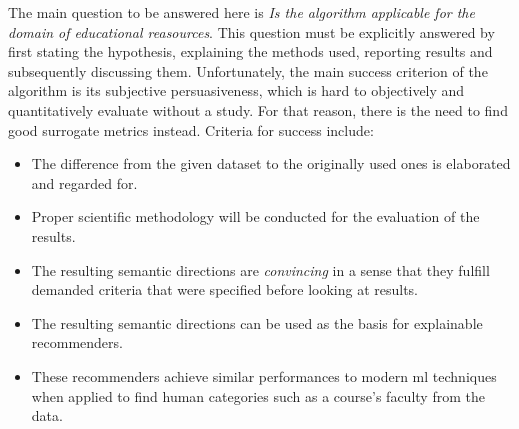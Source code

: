 The main question to be answered here is \textit{Is the algorithm applicable for the domain of educational reasources}. This question must be explicitly answered by first stating the hypothesis, explaining the methods used, reporting results and subsequently discussing them. Unfortunately, the main success criterion of the algorithm is its subjective persuasiveness, which is hard to objectively and quantitatively evaluate without a study. For that reason, there is the need to find good surrogate metrics instead. Criteria for success include:

\begin{itemize}
    \item The difference from the given dataset to the originally used ones is elaborated and regarded for.
    \item Proper scientific methodology will be conducted for the evaluation of the results.
    \item The resulting semantic directions are \textit{convincing} in a sense that they fulfill demanded criteria that were specified before looking at results.
    \item The resulting semantic directions can be used as the basis for explainable recommenders.
    \item These recommenders achieve similar performances to modern \gls{ml} techniques when applied to find human categories such as a course's faculty from the data.
\end{itemize}


